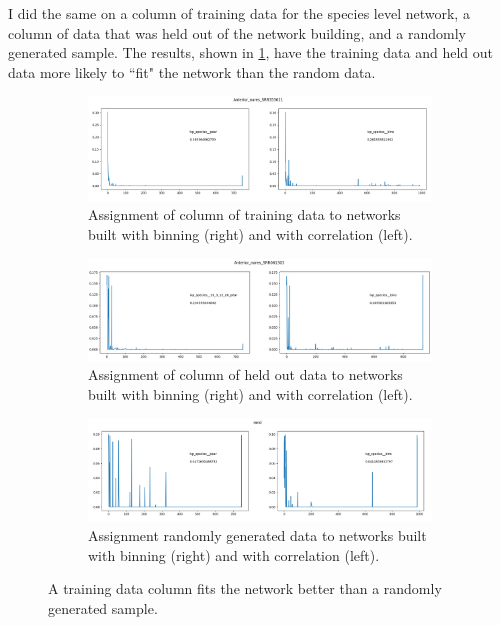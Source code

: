 \documentclass[10pt]{article}
\theoremstyle{definition}
\numberwithin{theorem}{section}
\numberwithin{definition}{section}
\numberwithin{lemma}{section}
\numberwithin{corollary}{section}
\numberwithin{clm}{section}
\numberwithin{rmk}{section}
\begin{document}
I did the same on a column of training data for the species level network, a column of data that was held out of the network building, and a randomly generated sample. The results, shown in \cref{full_assign}, have the training data and held out data more likely to ``fit" the network than the random data.

\begin{figure}
	\begin{subfigure}[b]{0.9\linewidth}
	\begin{center}
	\includegraphics[scale = 0.45]{a_nares.png}	
	\end{center}
	\caption{Assignment of column of training data to networks built with binning (right) and with correlation (left).}
	\end{subfigure}
	\begin{subfigure}[b]{0.9\linewidth}
	\begin{center}
		\includegraphics[scale = 0.45]{hldouts.png}	
	\end{center}
	\caption{Assignment of column of held out data to networks built with binning (right) and with correlation (left).}
\end{subfigure}
	\begin{subfigure}[b]{0.9\linewidth}
	\begin{center}
	\includegraphics[scale = 0.45]{random.png}	
	\end{center}
	\caption{Assignment randomly generated data to networks built with binning (right) and with correlation (left).}
	\end{subfigure}
\caption{A training data column fits the network better than a randomly generated sample.}\label{full_assign}
\end{figure}
\end{document}
